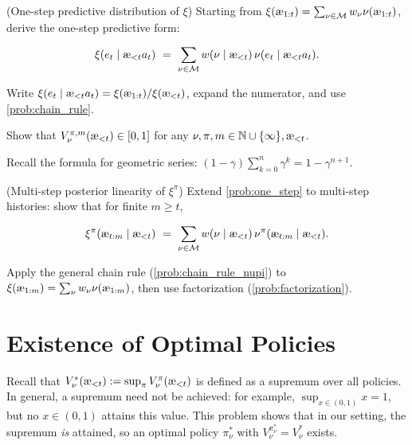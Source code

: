 \documentclass[fontsize=11pt, parskip=half]{scrartcl}
\newcommand{\cM}{\mathcal{M}}
\newcommand{\aes}{\textnormal{\ae}}
\begin{document}
\begin{exercise}
\label{prob:one_step}
(One-step predictive distribution of $\xi$)
Starting from $\xi(\aes_{1:t}) = \sum_{\nu \in \cM} w_\nu \nu(\aes_{1:t})$, derive the one-step predictive form:

\[
    \xi(e_t \mid \aes_{<t} a_t) ~=~ \sum_{\nu \in \cM} w(\nu \mid \aes_{<t})\, \nu(e_t \mid \aes_{<t} a_t).
\]
\begin{hint}
Write $\xi(e_t \mid \aes_{<t} a_t) = \xi(\aes_{1:t}) / \xi(\aes_{<t})$, expand the numerator, and use \cref{prob:chain_rule}.
\end{hint}
\end{exercise}


\begin{exercise}
\label{prob:bounded_value}
Show that $V_\nu^{\pi,m}(\aes_{<t}) \in [0,1]$ for any $\nu, \pi, m \in \mathbb{N} \cup \{\infty\}, \aes_{<t}$.


\begin{hint}
Recall the formula for geometric series: $(1-\gamma)\sum_{k=0}^{n} \gamma^k = 1 - \gamma^{n+1}$.
\end{hint}
\end{exercise}


\begin{exercise}
\label{prob:multi_step_xi}
\skippable
(Multi-step posterior linearity of $\xi^\pi$)
Extend \cref{prob:one_step} to multi-step histories: show that for finite $m \geq t$,

\[
    \xi^\pi(\aes_{t:m} \mid \aes_{<t})
    ~=~ \sum_{\nu \in \cM} w(\nu \mid \aes_{<t})\, \nu^\pi(\aes_{t:m} \mid \aes_{<t}).
\]
\begin{hint}
Apply the general chain rule (\cref{prob:chain_rule_nupi}) to $\xi(\aes_{1:m}) = \sum_\nu w_\nu \nu(\aes_{1:m})$, then use factorization (\cref{prob:factorization}).
\end{hint}
\end{exercise}



\section{Existence of Optimal Policies}\label{prob:optimal_exists}

Recall that $V_\nu^*(\aes_{<t}) := \sup_\pi V_\nu^\pi(\aes_{<t})$ is defined as a supremum over all policies. In general, a supremum need not be achieved: for example, $\sup_{x \in (0,1)} x = 1$, but no $x \in (0,1)$ attains this value. This problem shows that in our setting, the supremum \emph{is} attained, so an optimal policy $\pi_\nu^*$ with $V_\nu^{\pi_\nu^*} = V_\nu^*$ exists.
\end{document}
